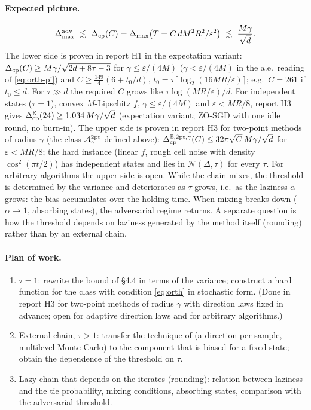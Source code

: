 \documentclass[10pt,a4paper]{article}
\newcommand{\E}{\mathbb E}\newcommand{\R}{\mathbb R}
\newcommand{\Dmax}{\Delta_{\max}}
\theoremstyle{definition}\newtheorem{definition}{Definition}
\begin{document}
\paragraph{Expected picture.}
\[
\Dmax^{\rm adv}\ \lesssim\ \Delta_{\rm cp}(C)=\Dmax\big(T=C\,dM^2R^2/\varepsilon^2\big)\ \lesssim\ \frac{M\gamma}{\sqrt d}.
\]
The lower side is proven in report H1 in the expectation variant: $\Delta_{\rm cp}(C)\ge M\gamma/\sqrt{2d+8\tau-3}$ for $\gamma\le\varepsilon/(4M)$ ($\gamma<\varepsilon/(4M)$ in the a.e.\ reading of \eqref{eq:orth-pi}) and $C\ge\frac{149}4(6+t_0/d)$, $t_0=\tau\lceil\log_2(16MR/\varepsilon)\rceil$; e.g.\ $C=261$ if $t_0\le d$. For $\tau\gg d$ the required $C$ grows like $\tau\log(MR/\varepsilon)/d$. For independent states ($\tau=1$), convex $M$-Lipschitz $f$, $\gamma\le\varepsilon/(4M)$ and $\varepsilon<MR/8$, report H3 gives $\Delta^{\E}_{\rm cp}(24)\ge1.034\,M\gamma/\sqrt d$ (expectation variant; ZO-SGD with one idle round, no burn-in). The upper side is proven in report H3 for two-point methods of radius $\gamma$ (the class $\mathcal A^{2\rm pt}_\gamma$ defined above): $\Delta^{\E,2\rm pt,\gamma}_{\rm cp}(C)\le32\pi\sqrt C\,M\gamma/\sqrt d$ for $\varepsilon<MR/8$; the hard instance (linear $f$, rough cell noise with density $\cos^2(\pi t/2)$) has independent states and lies in $\mathcal N(\Delta,\tau)$ for every $\tau$. For arbitrary algorithms the upper side is open.
While the chain mixes, the threshold is determined by the variance and deteriorates as $\tau$ grows, i.e.\ as the laziness $\alpha$ grows: the bias accumulates over the holding time. When mixing breaks down ($\alpha\to1$, absorbing states), the adversarial regime returns. A separate question is how the threshold depends on laziness generated by the method itself (rounding) rather than by an external chain.

\paragraph{Plan of work.}
\begin{enumerate}
\item $\tau=1$: rewrite the bound of \S4.4 \cite{survey} in terms of the variance; construct a hard function for the class with condition \eqref{eq:orth} in stochastic form. (Done in report H3 for two-point methods of radius $\gamma$ with direction laws fixed in advance; open for adaptive direction laws and for arbitrary algorithms.)
\item External chain, $\tau>1$: transfer the technique of \cite{prokhorov} (a direction per sample, multilevel Monte Carlo) to the component that is biased for a fixed state; obtain the dependence of the threshold on $\tau$.
\item Lazy chain that depends on the iterates (rounding): relation between laziness and the tie probability, mixing conditions, absorbing states, comparison with the adversarial threshold.
\end{enumerate}
\end{document}
